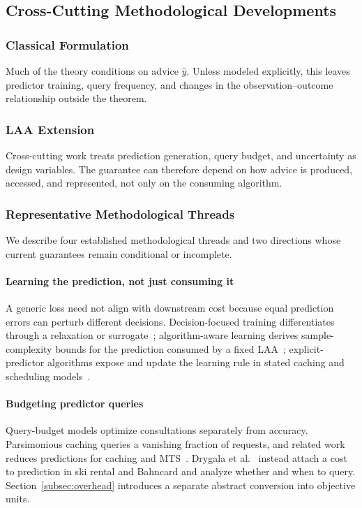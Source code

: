 \documentclass[acmsmall,screen,nonacm]{acmart}
\theoremstyle{acmdefinition}%
\begin{document}
\subsection{Cross-Cutting Methodological Developments}
\label{subsec:methodology_crosscutting}

\subsubsection{Classical Formulation}
Much of the theory conditions on advice $\hat y$. Unless modeled explicitly, this leaves predictor training, query frequency, and changes in the observation--outcome relationship outside the theorem.

\subsubsection{LAA Extension}
Cross-cutting work treats prediction generation, query budget, and uncertainty as design variables. The guarantee can therefore depend on how advice is produced, accessed, and represented, not only on the consuming algorithm.

\subsubsection{Representative Methodological Threads}
We describe four established methodological threads and two directions whose current guarantees remain conditional or incomplete.

\paragraph{Learning the prediction, not just consuming it}
A generic loss need not align with downstream cost because equal prediction errors can perturb different decisions. Decision-focused training differentiates through a relaxation or surrogate~\cite{wilder2019end}; algorithm-aware learning derives sample-complexity bounds for the prediction consumed by a fixed LAA~\cite{khodak2022learning}; explicit-predictor algorithms expose and update the learning rule in stated caching and scheduling models~\cite{elias2024explicit}.

\paragraph{Budgeting predictor queries}
Query-budget models optimize consultations separately from accuracy. Parsimonious caching queries a vanishing fraction of requests, and related work reduces predictions for caching and MTS~\cite{im2022parsimonious,sadek2024reduced}. Drygala et al.~\cite{drygala2023costly} instead attach a cost to prediction in ski rental and Bahncard and analyze whether and when to query. Section~\ref{subsec:overhead} introduces a separate abstract conversion into objective units.
\end{document}
